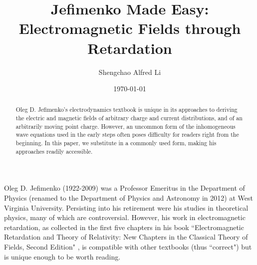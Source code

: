 \documentclass[11pt]{article}              %
\title{\bf Jefimenko Made Easy: Electromagnetic Fields through Retardation}    %
\author{Shengchao Alfred Li}            %
\affil{Amateur scientist in Potomac, Maryland, USA}
\affil{Email: shengchao.li@gmail.com}
\date{\today}
\begin{document}
\maketitle                              %
\begin{abstract}
Oleg D. Jefimenko's electrodynamics textbook is unique in its approaches to deriving the electric and magnetic fields of arbitrary charge and current distributions, and of an arbitrarily moving point charge. However, an uncommon form of the inhomogeneous wave equations used in the early steps often poses difficulty for readers right from the beginning. In this paper, we substitute in a commonly used form, making his approaches readily accessible.
\end{abstract}

Oleg D. Jefimenko (1922-2009) was a Professor Emeritus in the Department of Physics (renamed to the Department of Physics and Astronomy in 2012) at West Virginia University. Persisting into his retirement were his studies in theoretical physics, many of which are controversial. However, his work in electromagnetic retardation, as collected in the first five chapters in his book ``Electromagnetic Retardation and Theory of Relativity: New Chapters in the Classical Theory of Fields, Second Edition" \cite{jefimenko2004electromagnetic}, is compatible with other textbooks (thus ``correct") 
\cite{panofsky1962classical} \cite{matveyev1966principles} \cite{podolsky1969fundamentals} \cite{landau1971classical} \cite{schwartz1972principles} \cite{reitz1979foundations} \cite{barut1980electrodynamics} \cite{becker1982electromagnetic} \cite{heald1995classical}  \cite{jackson1998classical} \cite{schwinger1998classical} \cite{griffiths1999introduction} \cite{melia2001electrodynamics} \cite{brau2004modern} \cite{puri2011classical} \cite{steane2012relativity} \cite{franklin2017classical} \cite{davidson2019introduction} \cite{keohane2019introduction} but is unique enough to be worth reading. 
\end{document}
